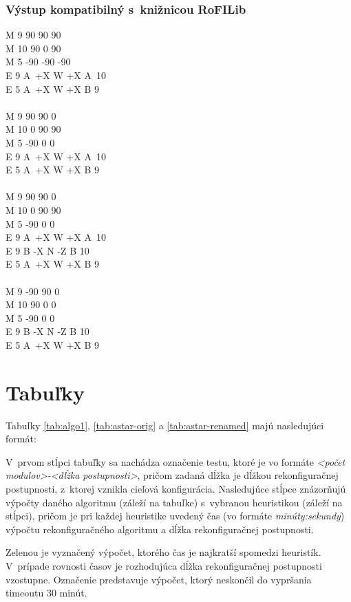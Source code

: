 \documentclass[
  printed, %
  oneside, %
  notable,   %
  nolof,     %
  nolot,     %
]{fithesis3}
\begin{document}
\subsection{Výstup kompatibilný s~knižnicou RoFILib}
M 9 90 90 90 \\
M 10 90 0 90 \\
M 5 -90 -90 -90 \\
E 9 A~+X W +X A~10 \\
E 5 A~+X W +X B 9 \\
\\
M 9 90 90 0 \\
M 10 0 90 90 \\
M 5 -90 0 0 \\
E 9 A~+X W +X A~10 \\
E 5 A~+X W +X B 9 \\
\\
M 9 90 90 0 \\
M 10 0 90 90 \\
M 5 -90 0 0 \\
E 9 A~+X W +X A~10 \\
E 9 B -X N -Z B 10 \\
E 5 A~+X W +X B 9 \\
\\
M 9 -90 90 0 \\
M 10 90 0 0 \\
M 5 -90 0 0 \\
E 9 B -X N -Z B 10 \\
E 5 A~+X W +X B 9

\chapter{Tabuľky}
\label{tab:tables}

Tabuľky \ref{tab:algo1}, \ref{tab:astar-orig} a \ref{tab:astar-renamed} majú nasledujúci formát: 

V~prvom stĺpci tabuľky sa nachádza označenie testu, ktoré je vo formáte \textit{<počet modulov>-<dĺžka postupnosti>}, pričom zadaná dĺžka je dĺžkou rekonfiguračnej postupnosti, z~ktorej vznikla cieľová konfigurácia. Nasledujúce stĺpce znázorňujú výpočty daného algoritmu (záleží na tabuľke) s~vybranou heuristikou (záleží na stĺpci), pričom je pri každej heuristike uvedený čas (vo formáte \textit{minúty:sekundy}) výpočtu rekonfiguračného algoritmu a dĺžka rekonfiguračnej postupnosti. 

\colorbox{table-green}{Zelenou} je vyznačený výpočet, ktorého čas je najkratší spomedzi heuristík. V~prípade rovnosti časov je rozhodujúca dĺžka rekonfiguračnej postupnosti vzostupne. Označenie \uv{--} predstavuje výpočet, ktorý neskončil do vypršania timeoutu 30 minút. 
\end{document}
